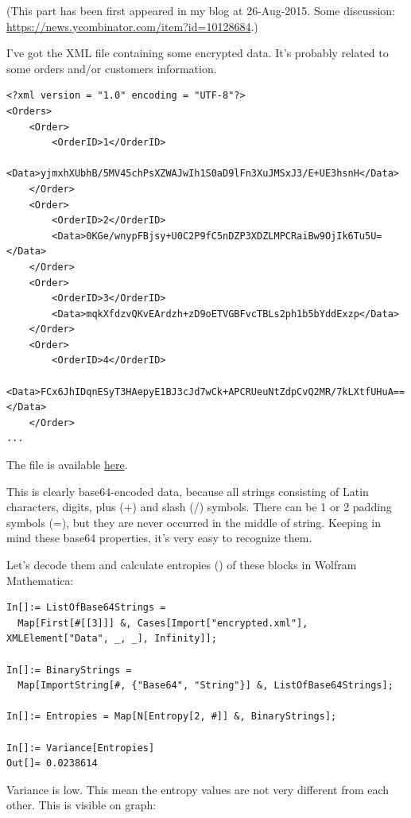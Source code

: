 \label{encrypted_DB1}

(This part has been first appeared in my blog at 26-Aug-2015.
Some discussion: \url{https://news.ycombinator.com/item?id=10128684}.)


I've got the XML file containing some encrypted data.
It's probably related to some orders and/or customers information.

\begin{lstlisting}
<?xml version = "1.0" encoding = "UTF-8"?>
<Orders>
	<Order>
		<OrderID>1</OrderID>
		<Data>yjmxhXUbhB/5MV45chPsXZWAJwIh1S0aD9lFn3XuJMSxJ3/E+UE3hsnH</Data>
	</Order>
	<Order>
		<OrderID>2</OrderID>
		<Data>0KGe/wnypFBjsy+U0C2P9fC5nDZP3XDZLMPCRaiBw9OjIk6Tu5U=</Data>
	</Order>
	<Order>
		<OrderID>3</OrderID>
		<Data>mqkXfdzvQKvEArdzh+zD9oETVGBFvcTBLs2ph1b5bYddExzp</Data>
	</Order>
	<Order>
		<OrderID>4</OrderID>
		<Data>FCx6JhIDqnESyT3HAepyE1BJ3cJd7wCk+APCRUeuNtZdpCvQ2MR/7kLXtfUHuA==</Data>
	</Order>
...
\end{lstlisting}

The file is available \href{https://raw.githubusercontent.com/dennis714/yurichev.com/master/blog/encrypted_DB_case_1/encrypted.xml}{here}.

This is clearly base64-encoded data, because all strings consisting of Latin characters, digits,
plus (+) and slash (/) symbols.
There can be 1 or 2 padding symbols (=), but they are never occurred in the middle of string.
Keeping in mind these base64 properties, it's very easy to recognize them.

Let's decode them and calculate entropies () of these blocks in Wolfram Mathematica:

\begin{lstlisting}
In[]:= ListOfBase64Strings = 
  Map[First[#[[3]]] &, Cases[Import["encrypted.xml"], XMLElement["Data", _, _], Infinity]];

In[]:= BinaryStrings = 
  Map[ImportString[#, {"Base64", "String"}] &, ListOfBase64Strings];

In[]:= Entropies = Map[N[Entropy[2, #]] &, BinaryStrings];

In[]:= Variance[Entropies]
Out[]= 0.0238614
\end{lstlisting}

Variance is low.
This mean the entropy values are not very different from each other.
This is visible on graph:

